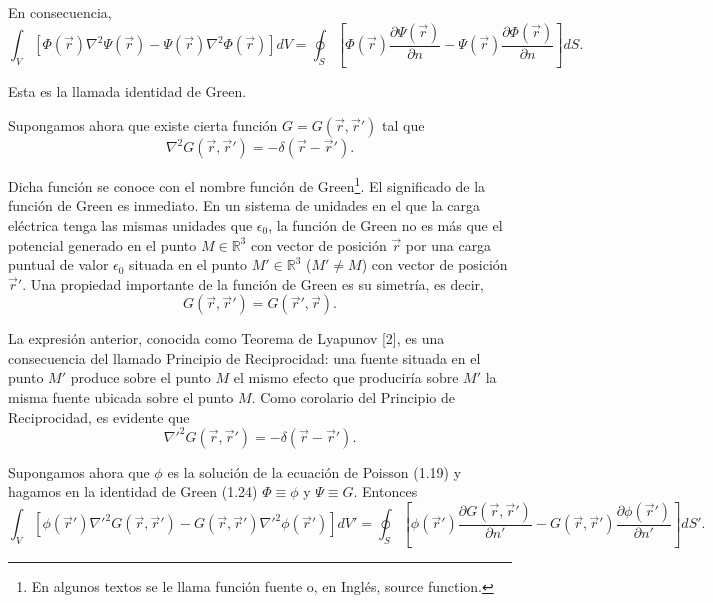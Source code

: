 \documentclass[12pt,a4paper]{book}
\begin{document}
En consecuencia,
\begin{equation}
\int_V \left[ \Phi(\vec{r})\nabla^2\Psi(\vec{r}) - \Psi(\vec{r})\nabla^2\Phi(\vec{r}) \right] dV = \oint_S \left[ \Phi(\vec{r})\frac{\partial\Psi(\vec{r})}{\partial n} - \Psi(\vec{r})\frac{\partial\Phi(\vec{r})}{\partial n} \right] dS.
\end{equation}

Esta es la llamada identidad de Green.

Supongamos ahora que existe cierta función $G = G(\vec{r},\vec{r}')$ tal que
\begin{equation}
\nabla^2 G(\vec{r},\vec{r}') = -\delta(\vec{r} - \vec{r}').
\end{equation}

Dicha función se conoce con el nombre función de Green\footnote{En algunos textos se le llama función fuente o, en Inglés, source function.}. El significado de la función de Green es inmediato. En un sistema de unidades en el que la carga eléctrica tenga las mismas unidades que $\epsilon_0$, la función de Green no es más que el potencial generado en el punto $M \in \mathbb{R}^3$ con vector de posición $\vec{r}$ por una carga puntual de valor $\epsilon_0$ situada en el punto $M' \in \mathbb{R}^3$ ($M' \neq M$) con vector de posición $\vec{r}'$. Una propiedad importante de la función de Green es su simetría, es decir,
\begin{equation}
G(\vec{r},\vec{r}') = G(\vec{r}',\vec{r}).
\end{equation}

La expresión anterior, conocida como Teorema de Lyapunov [2], es una consecuencia del llamado Principio de Reciprocidad: una fuente situada en el punto $M'$ produce sobre el punto $M$ el mismo efecto que produciría sobre $M'$ la misma fuente ubicada sobre el punto $M$. Como corolario del Principio de Reciprocidad, es evidente que
\begin{equation}
\nabla'^2G(\vec{r},\vec{r}') = -\delta(\vec{r} - \vec{r}').
\end{equation}

Supongamos ahora que $\phi$ es la solución de la ecuación de Poisson (1.19) y hagamos en la identidad de Green (1.24) $\Phi \equiv \phi$ y $\Psi \equiv G$. Entonces
\begin{equation}
\int_V \left[ \phi(\vec{r}')\nabla'^2 G(\vec{r},\vec{r}') - G(\vec{r},\vec{r}')\nabla'^2\phi(\vec{r}') \right] dV' = \oint_S \left[ \phi(\vec{r}')\frac{\partial G(\vec{r},\vec{r}')}{\partial n'} - G(\vec{r},\vec{r}')\frac{\partial\phi(\vec{r}')}{\partial n'} \right] dS'.
\end{equation}
\end{document}

